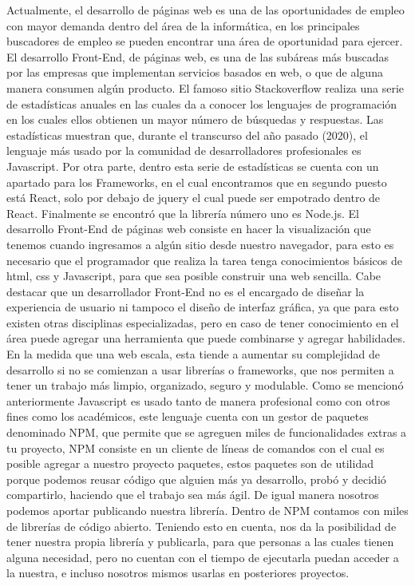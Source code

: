 Actualmente, el desarrollo de páginas web es una de las oportunidades de empleo con mayor demanda dentro del área de la informática, en los principales buscadores de empleo se pueden encontrar una área de oportunidad para ejercer. El desarrollo Front-End, de páginas web, es una de las subáreas más buscadas por las empresas que implementan servicios basados en web, o que de alguna manera consumen algún producto. 
El famoso sitio Stackoverflow realiza una serie de estadísticas anuales en las cuales da a conocer los lenguajes de programación en los cuales ellos obtienen un mayor número de búsquedas y respuestas. Las estadísticas muestran que, durante el transcurso del año pasado (2020), el lenguaje más usado por la comunidad de desarrolladores profesionales es Javascript. 
Por otra parte, dentro esta serie de estadísticas se cuenta con un apartado para los Frameworks, en el cual encontramos que en segundo puesto está React, solo por debajo de jquery el cual puede ser empotrado dentro de React.  Finalmente se encontró que la librería número uno es Node.js. 
El desarrollo Front-End de páginas web consiste en hacer la visualización que tenemos cuando ingresamos a algún sitio desde nuestro navegador, para esto es necesario que el programador que realiza la tarea tenga conocimientos básicos de html, css y Javascript, para que sea posible construir una web sencilla. Cabe destacar que un desarrollador Front-End no es el encargado de diseñar la experiencia de usuario ni tampoco el diseño de interfaz gráfica, ya que para esto existen otras disciplinas especializadas, pero en caso de tener conocimiento en el área puede agregar una herramienta que puede combinarse y agregar habilidades.
\newline
En la medida que una web escala, esta tiende a aumentar su complejidad de desarrollo si no se comienzan a usar librerías o frameworks, que nos permiten a tener un trabajo más limpio, organizado, seguro y modulable. 
Como se mencionó anteriormente Javascript es usado tanto de manera profesional como con otros fines como los académicos, este lenguaje cuenta con un gestor de paquetes denominado NPM, que permite que se agreguen miles de funcionalidades extras a tu proyecto, NPM consiste en un cliente de líneas de comandos con el cual es posible agregar a nuestro proyecto paquetes, estos paquetes son de utilidad porque podemos reusar código que alguien más ya desarrollo, probó y decidió compartirlo, haciendo que el trabajo sea más ágil.  De igual manera nosotros podemos aportar publicando nuestra librería. Dentro de NPM contamos con miles de librerías de código abierto.  
Teniendo esto en cuenta, nos da la posibilidad de tener nuestra propia librería y publicarla, para que personas a las cuales tienen alguna necesidad, pero no cuentan con el tiempo de ejecutarla puedan acceder a la nuestra, e incluso nosotros mismos usarlas en posteriores proyectos. 

